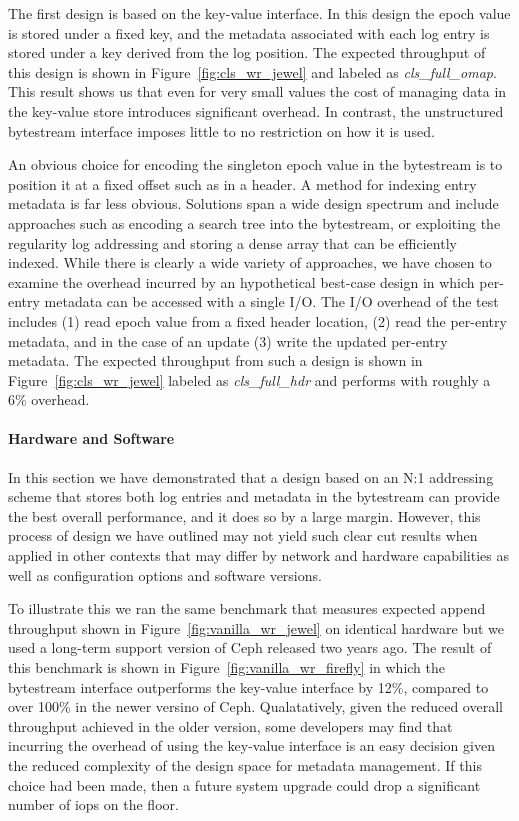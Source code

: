 \documentclass[10pt,twocolumn]{article}
\begin{document}
The first design is based on the key-value interface. In this design the epoch
value is stored under a fixed key, and the metadata associated with each log
entry is stored under a key derived from the log position. The expected throughput of
this design is shown in Figure~\ref{fig:cls_wr_jewel} and labeled as
\emph{cls\_full\_omap}. This result shows us that even for very small values
the cost of managing data in the key-value store introduces significant
overhead. In contrast, the unstructured bytestream interface imposes little
to no restriction on how it is used.

An obvious choice for encoding the singleton epoch value in the bytestream is
to position it at a fixed offset such as in a header. A method for indexing
entry metadata is far less obvious. Solutions span a wide design spectrum and
include approaches such as encoding a search tree into the bytestream, or
exploiting the regularity log addressing and storing a dense array that can be
efficiently indexed. While there is clearly a wide variety of approaches, we
have chosen to examine the overhead incurred by an hypothetical best-case
design in which per-entry metadata can be accessed with a single I/O. The I/O
overhead of the test includes (1) read epoch value from a fixed header
location, (2) read the per-entry metadata, and in the case of an update (3)
write the updated per-entry metadata. The expected throughput from such a
design is shown in Figure~\ref{fig:cls_wr_jewel} labeled as
\emph{cls\_full\_hdr} and performs with roughly a 6\% overhead.

\paragraph*{Hardware and Software}

In this section we have demonstrated that a design based on an N:1 addressing
scheme that stores both log entries and metadata in the bytestream can provide
the best overall performance, and it does so by a large margin. However, this
process of design we have outlined may not yield such clear cut results when
applied in other contexts that may differ by network and hardware capabilities
as well as configuration options and software versions.

To illustrate this we ran the same benchmark that measures expected append
throughput shown in Figure~\ref{fig:vanilla_wr_jewel} on identical hardware
but we used a long-term support version of Ceph released two years
ago. The result of this benchmark is shown in Figure~\ref{fig:vanilla_wr_firefly}
in which the bytestream interface outperforms the key-value interface by 12\%,
compared to over 100\% in the newer versino of Ceph. Qualatatively, given the
reduced overall throughput achieved in the older version, some developers may
find that incurring the overhead of using the key-value interface is an easy
decision given the reduced complexity of the design space for metadata
management. If this choice had been made, then a future system upgrade could
drop a significant number of iops on the floor.
\end{document}
